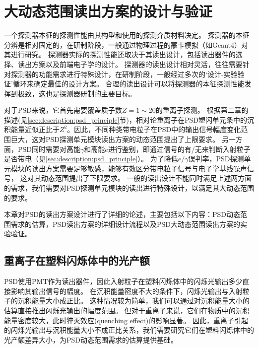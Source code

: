\chapter{大动态范围读出方案的设计与验证}
\label{ch:large_dynmaicrange}
一个探测器本征的探测性能由其构型和使用的探测介质材料决定。
探测器的本征分辨是相对固定的，在研制阶段，一般通过物理过程的蒙卡模拟（如Geant4）对其进行研究。
探测器实际的探测性能还取决于其读出设计，包括读出器件的选择、读出方案以及前端电子学的设计。
探测器的读出设计相对灵活，往往需要针对探测器的功能需求进行特殊设计，在研制阶段，一般经过多次的‘设计-实验验证’循环来确定最佳的设计方案。
合理的读出设计可以将探测器的本征探测性能发挥到极致，这也是探测器研制的主要目标。

对于PSD来说，它首先需要覆盖质子数$Z=1 \sim 20$的重离子探测。
根据第二章的描述(见\ref{sec:description:psd_principle}节)，相对论重离子在PSD塑闪单元条中的沉积能量近似正比于$Z^2$。因此，不同种类带电粒子在PSD中的输出信号幅度变化范围巨大，这对PSD探测单元模块读出方案的动态范围提出了上限要求。
另一方面，PSD同时需要对高能$\gamma$和高能$e$进行鉴别，即通过信号的有/无来判断入射粒子是否带电（见\ref{sec:description:psd_principle}）。
为了降低$e/\gamma$误判率，PSD探测单元模块的读出方案需要足够敏感，能够有效区分带电粒子信号与电子学基线噪声信号，
这对其动态范围提出了下限要求。
一般的读出设计不能同时满足上述两方面的需求，我们需要对PSD探测单元模块的读出进行特殊设计，以满足其大动态范围的要求。

本章对PSD的读出方案设计进行了详细的论述，主要包括以下内容：PSD动态范围需求的估算，PSD读出方案的详细设计流程以及PSD大动态范围读出方案的实验验证。


\section{重离子在塑料闪烁体中的光产额}
\label{sec:dynamic_range:light_yield}
PSD使用PMT作为读出器件，因此入射粒子在塑料闪烁体中的闪烁光输出多少直接影响其输出信号的幅度。
在沉积能量密度不大的条件下，闪烁光输出与入射粒子的沉积能量大小成正比。
这种情况较为简单，我们可以通过对沉积能量大小的估算直接推出闪烁光输出的幅度范围。
但对于重离子来说，它们在物质中的沉积能量密度较大，此时猝灭效应\cite{birks_book_2013}(quenching effect)的影响显著。
因此，重离子引起的闪烁光输出与沉积能量大小不成正比关系，我们需要研究它们在塑料闪烁体中的光产额差异大小，为PSD动态范围需求的估算提供基础。

